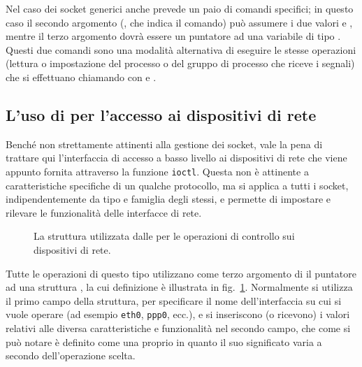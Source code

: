 Nel caso dei socket generici anche  prevede un paio di comandi
specifici; in questo caso il secondo argomento (, che indica il
comando) può assumere i due valori  e ,
mentre il terzo argomento dovrà essere un puntatore ad una variabile di tipo
. Questi due comandi sono una modalità alternativa di eseguire le
stesse operazioni (lettura o impostazione del processo o del gruppo di
processo che riceve i segnali) che si effettuano chiamando  con
 e .


\subsection{L'uso di  per l'accesso ai dispositivi di rete}
\label{sec:sock_ioctl_netdevice}

Benché non strettamente attinenti alla gestione dei socket, vale la pena di
trattare qui l'interfaccia di accesso a basso livello ai dispositivi di rete
che viene appunto fornita attraverso la funzione \texttt{ioctl}. Questa non è
attinente a caratteristiche specifiche di un qualche protocollo, ma si applica
a tutti i socket, indipendentemente da tipo e famiglia degli stessi, e
permette di impostare e rilevare le funzionalità delle interfacce di rete.

\begin{figure}[!htb]
  \footnotesize \centering
  \begin{minipage}[c]{0.80\textwidth}
  \end{minipage}
  \caption{La struttura  utilizzata dalle  per le
    operazioni di controllo sui dispositivi di rete.}
  \label{fig:netdevice_ifreq_struct}
\end{figure}

Tutte le operazioni di questo tipo utilizzano come terzo argomento di
 il puntatore ad una struttura , la cui definizione
è illustrata in fig.~\ref{fig:netdevice_ifreq_struct}. Normalmente si utilizza
il primo campo della struttura,  per specificare il nome
dell'interfaccia su cui si vuole operare (ad esempio \texttt{eth0},
\texttt{ppp0}, ecc.), e si inseriscono (o ricevono) i valori relativi alle
diversa caratteristiche e funzionalità nel secondo campo, che come si può
notare è definito come una  proprio in quanto il suo significato
varia a secondo dell'operazione scelta.

